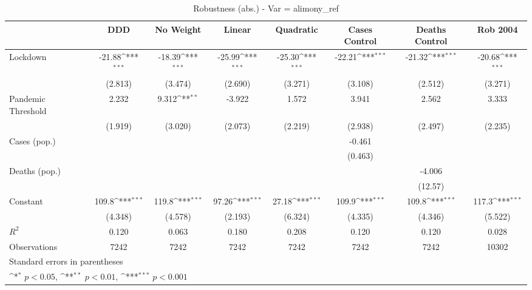 \documentclass{article}
\begin{document}
{
\def\sym#1{\ifmmode^{#1}\else\(^{#1}\)\fi}
\begin{longtable}{l*{7}{c}}
\caption{Robustness (abs.) - Var = alimony\_ref}\\
\hline\hline\endfirsthead\hline\endhead\hline\endfoot\endlastfoot
                &\multicolumn{1}{c}{DDD}&\multicolumn{1}{c}{No Weight}&\multicolumn{1}{c}{Linear}&\multicolumn{1}{c}{Quadratic}&\multicolumn{1}{c}{Cases Control}&\multicolumn{1}{c}{Deaths Control}&\multicolumn{1}{c}{Rob 2004}\\
\hline
Lockdown        &   -21.88\sym{***}&   -18.39\sym{***}&   -25.99\sym{***}&   -25.30\sym{***}&   -22.21\sym{***}&   -21.32\sym{***}&   -20.68\sym{***}\\
                &  (2.813)         &  (3.474)         &  (2.690)         &  (3.271)         &  (3.108)         &  (2.512)         &  (3.271)         \\
Pandemic Threshold&    2.232         &    9.312\sym{**} &   -3.922         &    1.572         &    3.941         &    2.562         &    3.333         \\
                &  (1.919)         &  (3.020)         &  (2.073)         &  (2.219)         &  (2.938)         &  (2.497)         &  (2.235)         \\
Cases (pop.)    &                  &                  &                  &                  &   -0.461         &                  &                  \\
                &                  &                  &                  &                  &  (0.463)         &                  &                  \\
Deaths (pop.)   &                  &                  &                  &                  &                  &   -4.006         &                  \\
                &                  &                  &                  &                  &                  &  (12.57)         &                  \\
Constant        &    109.8\sym{***}&    119.8\sym{***}&    97.26\sym{***}&    27.18\sym{***}&    109.9\sym{***}&    109.8\sym{***}&    117.3\sym{***}\\
                &  (4.348)         &  (4.578)         &  (2.193)         &  (6.324)         &  (4.335)         &  (4.346)         &  (5.522)         \\
\hline
\(R^{2}\)       &    0.120         &    0.063         &    0.180         &    0.208         &    0.120         &    0.120         &    0.028         \\
Observations    &     7242         &     7242         &     7242         &     7242         &     7242         &     7242         &    10302         \\
\hline\hline
\multicolumn{8}{l}{\footnotesize Standard errors in parentheses}\\
\multicolumn{8}{l}{\footnotesize \sym{*} \(p<0.05\), \sym{**} \(p<0.01\), \sym{***} \(p<0.001\)}\\
\end{longtable}
}
\end{document}
